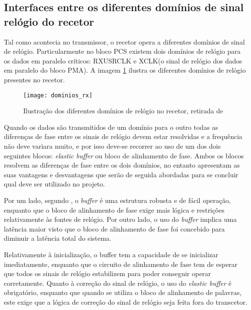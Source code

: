 \subsection{Interfaces entre os diferentes domínios de sinal relógio do recetor}

Tal como acontecia no transmissor, o recetor opera a diferentes domínios de sinal de relógio. Particularmente no bloco PCS existem dois domínios de relógio para os dados em paralelo críticos: RXUSRCLK e XCLK(o sinal de relógio dos dados em paralelo do bloco PMA). A imagem \ref{fig:dominios_rx} ilustra os diferentes domínios de relógio presentes no recetor.


\begin{figure}[h!]
	\begin{center}
		\leavevmode
		\texttt{[image: dominios\_rx]}
		\captionsetup{width=1.0\linewidth}
		\caption{Ilustração dos diferentes domínios de relógio no recetor, retirada de \cite{R011}}
		\label{fig:dominios_rx}
	\end{center}
\end{figure}

Quando os dados são transmitidos de um domínio para o outro todas as diferenças de fase entre os sinais de relógio devem estar resolvidas e a frequência não deve variara muito, e por isso deve-se recorrer ao uso de um dos dois seguintes blocos: \textit{elastic buffer} ou bloco de alinhamento de fase. Ambos os blocos resolvem as diferenças de fase entre os dois domínios, no entanto apresentam as suas vantagens e desvantagens que serão de seguida abordadas para se concluir qual deve ser utilizado no projeto.

Por um lado, segundo \cite{R011}, o \textit{buffer} é uma estrutura robusta e de fácil operação, enquanto que o bloco de alinhamento de fase exige mais lógica e restrições relativamente às fontes de relógio. Por outro lado, o uso do \textit{buffer} implica uma latência maior visto que o bloco de alinhamento de fase foi concebido para diminuir a latência total do sistema. 

Relativamente à inicialização, o buffer tem a capacidade de se inicializar imediatamente, enquanto que o circuito de alinhamento de fase tem de esperar que todos os sinais de relógio estabilizem para poder conseguir operar corretamente. Quanto à correção do sinal de relógio, o uso do\textit{ elastic buffer} é obrigatório, enquanto que quando se utiliza o bloco de alinhamento de palavras, este exige que a lógica de correção do sinal de relógio seja feita fora do transcetor.

